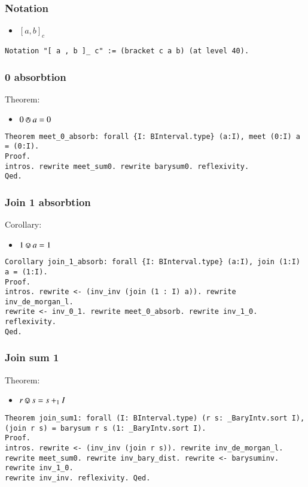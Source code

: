 \documentclass[a4paper,10pt]{article} %
\newcommand{\meet}{\circledwedge}
\newcommand{\join}{\circledvee}
\begin{document}
\subsubsection{Notation}
\begin{itemize}
    \item $[a, b]_c$
\end{itemize}
\begin{lstlisting}
Notation "[ a , b ]_ c" := (bracket c a b) (at level 40).
\end{lstlisting}

\subsubsection{0 absorbtion}
Theorem:
\begin{itemize}
    \item  $0 \meet a = 0$
\end{itemize}
\begin{lstlisting}
Theorem meet_0_absorb: forall {I: BInterval.type} (a:I), meet (0:I) a = (0:I).
Proof.
intros. rewrite meet_sum0. rewrite barysum0. reflexivity.
Qed.
\end{lstlisting}

\subsubsection{Join 1 absorbtion}
Corollary:
\begin{itemize}
    \item $1 \join a = 1$
\end{itemize}
\begin{lstlisting}
Corollary join_1_absorb: forall {I: BInterval.type} (a:I), join (1:I) a = (1:I).
Proof.
intros. rewrite <- (inv_inv (join (1 : I) a)). rewrite inv_de_morgan_l. 
rewrite <- inv_0_1. rewrite meet_0_absorb. rewrite inv_1_0. reflexivity.
Qed.
\end{lstlisting}

\subsubsection{Join sum 1}
Theorem:
\begin{itemize}
    \item $r \join s = s + _1I$
\end{itemize}
\begin{lstlisting}
Theorem join_sum1: forall (I: BInterval.type) (r s: _BaryIntv.sort I), (join r s) = barysum r s (1: _BaryIntv.sort I).
Proof.
intros. rewrite <- (inv_inv (join r s)). rewrite inv_de_morgan_l. 
rewrite meet_sum0. rewrite inv_bary_dist. rewrite <- barysuminv. rewrite inv_1_0. 
rewrite inv_inv. reflexivity. Qed.
\end{lstlisting}
\end{document}
